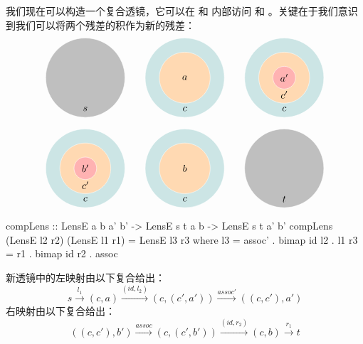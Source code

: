 \documentclass[DaoFP]{subfiles}
\begin{document}
我们现在可以构造一个复合透镜，它可以在  和  内部访问  和 。关键在于我们意识到我们可以将两个残差的积作为新的残差：
\[
\begin{tikzpicture}
\filldraw[fill=gray!50, draw=white] (0, 0) circle (1.4);
\node at (0, -1.1) {$s$};
\end{tikzpicture}
\hspace{20pt}
\begin{tikzpicture}
\filldraw[fill=blue!50!green!20, draw=white] (0, 0) circle (1.4);
\filldraw[fill=orange!30, draw=white] (0, 0) circle (0.9);
\node at (0, 0) {$a$};
\node at (0, -1.1) {$c$};
\end{tikzpicture}
\hspace{20pt}
\begin{tikzpicture}
\filldraw[fill=blue!50!green!20, draw=white] (0, 0) circle (1.4);
\filldraw[fill=orange!30, draw=white] (0, 0) circle (0.9);
\filldraw[fill=red!30, draw=white] (0, 0) circle (0.4);
\node at (0, 0) {$a'$};
\node at (0, -0.6) {$c'$};
\node at (0, -1.1) {$c$};
\end{tikzpicture}
\]

\[
\begin{tikzpicture}
\filldraw[fill=blue!50!green!20, draw=white] (0, 0) circle (1.4);
\filldraw[fill=orange!30, draw=white] (0, 0) circle (0.9);
\filldraw[fill=red!30, draw=white] (0, 0) circle (0.4);
\node at (0, 0) {$b'$};
\node at (0, -0.6) {$c'$};
\node at (0, -1.1) {$c$};
\end{tikzpicture}
\hspace{20pt}
\begin{tikzpicture}
\filldraw[fill=blue!50!green!20, draw=white] (0, 0) circle (1.4);
\filldraw[fill=orange!30, draw=white] (0, 0) circle (0.9);
\node at (0, 0) {$b$};
\node at (0, -1.1) {$c$};
\end{tikzpicture}
\hspace{20pt}
\begin{tikzpicture}
\filldraw[fill=gray!50, draw=white] (0, 0) circle (1.4);
\node at (0, -1.1) {$t$};
\end{tikzpicture}
\]

\begin{haskell}
compLens :: LensE a b a' b' -> LensE s t a b -> LensE s t a' b'
compLens (LensE l2 r2) (LensE l1 r1) = LensE l3 r3
  where l3 = assoc' . bimap id l2  . l1
        r3 = r1 . bimap id r2 . assoc
\end{haskell}
新透镜中的左映射由以下复合给出：
\[ s \xrightarrow{l_1} (c, a)   \xrightarrow{(id, l_2)} (c, (c', a'))  \xrightarrow{assoc'} ((c, c'), a')\]
右映射由以下复合给出：
\[ ((c, c'), b') \xrightarrow{assoc}  (c, (c', b')) \xrightarrow{(id, r_2)} (c, b) \xrightarrow{r_1} t \]
\end{document}
